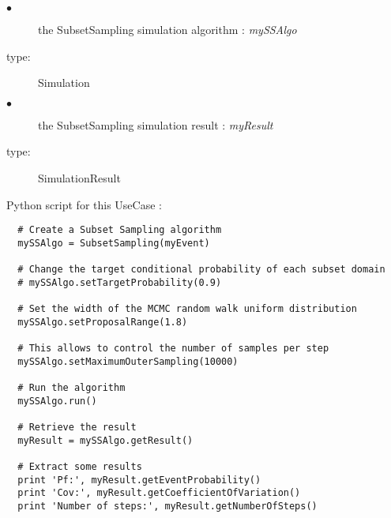 {
  \begin{description}
  \item[$\bullet$] the SubsetSampling simulation algorithm : {\itshape mySSAlgo}
  \item[type:] Simulation
  \item[$\bullet$] the SubsetSampling simulation result : {\itshape myResult}
  \item[type:] SimulationResult
  \end{description}
}

\newpage
Python  script for this UseCase :

\begin{lstlisting}
  # Create a Subset Sampling algorithm
  mySSAlgo = SubsetSampling(myEvent)

  # Change the target conditional probability of each subset domain
  # mySSAlgo.setTargetProbability(0.9)

  # Set the width of the MCMC random walk uniform distribution
  mySSAlgo.setProposalRange(1.8)

  # This allows to control the number of samples per step
  mySSAlgo.setMaximumOuterSampling(10000)

  # Run the algorithm
  mySSAlgo.run()

  # Retrieve the result
  myResult = mySSAlgo.getResult()
  
  # Extract some results
  print 'Pf:', myResult.getEventProbability()
  print 'Cov:', myResult.getCoefficientOfVariation()
  print 'Number of steps:', myResult.getNumberOfSteps()
\end{lstlisting}

